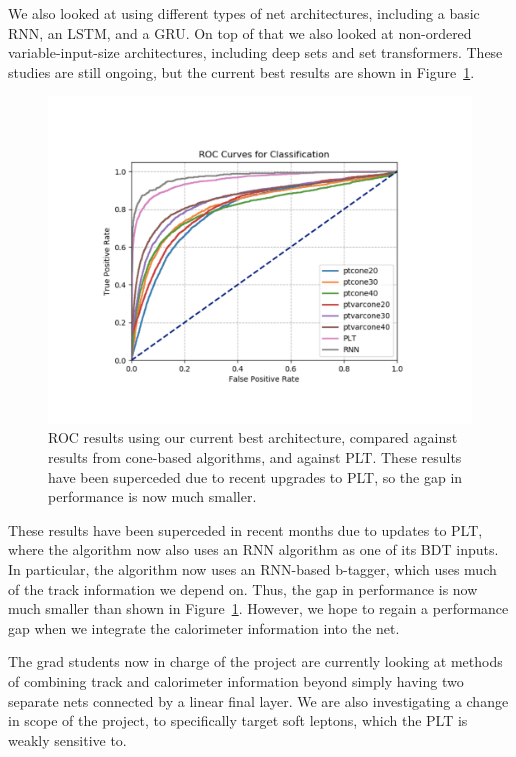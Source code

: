 We also looked at using different types of net architectures, including a basic RNN, an LSTM, and a GRU. On top of that we also looked at non-ordered variable-input-size architectures, including deep sets and set transformers. These studies are still ongoing, but the current best results are shown in Figure~\ref{fig:RNN_results}.

\begin{figure}[htbp]
    \centering
    \includegraphics[trim=0 70 0 70, clip,width=\textwidth]{Images/RNN/ROC.pdf}
    \caption{ROC results using our current best architecture, compared against results from cone-based algorithms, and against PLT. These results have been superceded due to recent upgrades to PLT, so the gap in performance is now much smaller.}
    \label{fig:RNN_results}
\end{figure}

These results have been superceded in recent months due to updates to PLT, where the algorithm now also uses an RNN algorithm as one of its BDT inputs. In particular, the algorithm now uses an RNN-based b-tagger, which uses much of the track information we depend on. Thus, the gap in performance is now much smaller than shown in Figure~\ref{fig:RNN_results}. However, we hope to regain a performance gap when we integrate the calorimeter information into the net.

The grad students now in charge of the project are currently looking at methods of combining track and calorimeter information beyond simply having two separate nets connected by a linear final layer. We are also investigating a change in scope of the project, to specifically target soft leptons, which the PLT is weakly sensitive to.